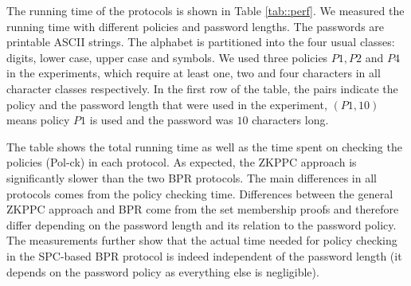 \begin{table}[!t]
\begin{center}
\vspace*{1em}
\caption[BPR Protocol Performance]{Protocol Performance (Running Time in Milliseconds)} \label{tab::perf}
\end{center}
\end{table} 

The running time of the protocols is shown in Table \ref{tab::perf}. We measured the running time with different policies and password lengths. The passwords are printable \ac{ASCII} strings. 
The alphabet is partitioned into the four usual classes: digits, lower case, upper case and symbols. 
We used three policies $P1, P2$ and $P4$ in the experiments, which require at least one, two and four characters in all character classes respectively. 
In the first row of the table, the pairs indicate the policy and the password length that were used in the experiment, \eg $(P1, 10)$ means policy $P1$ is used and the password was $10$ characters long. 

The table shows the total running time as well as the time spent on checking the policies (Pol-ck) in each protocol. 
As expected, the \ac{ZKPPC} approach is significantly slower than the two \ac{BPR} protocols.
The main differences in all protocols comes from the policy checking time.
Differences between the general \ac{ZKPPC} approach and \ac{BPR} come from the set membership proofs and therefore differ depending on the password length and its relation to the password policy. 
The measurements further show that the actual time needed for policy checking in the \ac{SPC}-based \ac{BPR} protocol is indeed independent of the password length (it depends on the password policy as everything else is negligible).


